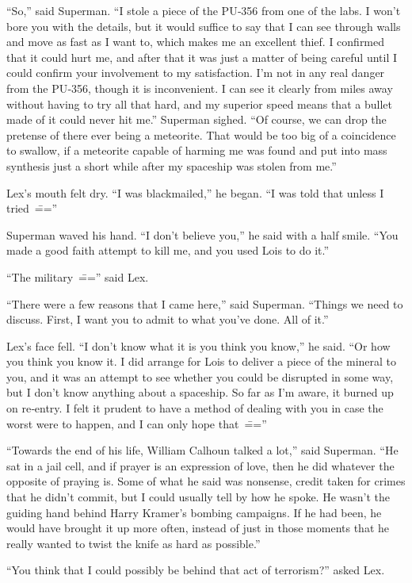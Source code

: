 \documentclass[ebook,12pt]{memoir}
\begin{document}
``So,'' said Superman. ``I stole a piece of the PU‐356 from one of the
labs. I won't bore you with the details, but it would suffice to say
that I can see through walls and move as fast as I want to, which makes
me an excellent thief. I confirmed that it could hurt me, and after that
it was just a matter of being careful until I could confirm your
involvement to my satisfaction. I'm not in any real danger from the
PU‐356, though it is inconvenient. I can see it clearly from miles away
without having to try all that hard, and my superior speed means that a
bullet made of it could never hit me.'' Superman sighed. ``Of course, we
can drop the pretense of there ever being a meteorite. That would be too
big of a coincidence to swallow, if a meteorite capable of harming me
was found and put into mass synthesis just a short while after my
spaceship was stolen from me.''

Lex's mouth felt dry. ``I was blackmailed,'' he began. ``I was told that
unless I tried~\===''

Superman waved his hand. ``I don't believe you,'' he said with a half
smile. ``You made a good faith attempt to kill me, and you used Lois to
do it.''

``The military~\==='' said Lex.

``There were a few reasons that I came here,'' said Superman. ``Things
we need to discuss. First, I want you to admit to what you've done. All
of it.''

Lex's face fell. ``I don't know what it is you think you know,'' he
said. ``Or how you think you know it. I did arrange for Lois to deliver
a piece of the mineral to you, and it was an attempt to see whether you
could be disrupted in some way, but I don't know anything about a
spaceship. So far as I'm aware, it burned up on re‐entry. I felt it
prudent to have a method of dealing with you in case the worst were to
happen, and I can only hope that~\===''

``Towards the end of his life, William Calhoun talked a lot,'' said
Superman. ``He sat in a jail cell, and if prayer is an expression of
love, then he did whatever the opposite of praying is. Some of what he
said was nonsense, credit taken for crimes that he didn't commit, but I
could usually tell by how he spoke. He wasn't the guiding hand behind
Harry Kramer's bombing campaigns. If he had been, he would have brought
it up more often, instead of just in those moments that he really wanted
to twist the knife as hard as possible.''

``You think that I could possibly be behind that act of terrorism?''
asked Lex.
\end{document}
